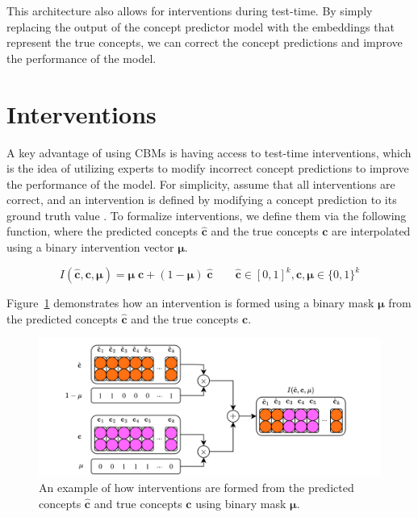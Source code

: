 This architecture also allows for interventions during test-time. By simply replacing
the output of the concept predictor model with the embeddings that represent
the true concepts, we can correct the concept predictions
 and improve the performance of the model. 


\section{Interventions}
A key advantage of using CBMs is having access to 
test-time interventions, which is the idea of utilizing experts
to modify incorrect concept predictions to improve the 
performance of the model.
For simplicity, assume that
all interventions are correct,  
and an intervention is defined by 
modifying a concept prediction to its ground truth value
. To formalize interventions, we define
them via the following function, where
the predicted concepts $\hat{\mathbf{c}}$ and the true concepts $\mathbf{c}$ are interpolated
using a binary intervention vector $\bm{\mu}$.

\begin{equation}\label{equation:intervention}
I(\hat{\mathbf{c}}, \mathbf{c}, \bm{\mu}) = 
\bm{\mu} \; \mathbf{c} + (1 - \bm{\mu}) \; \hat{\mathbf{c}} \qquad \hat{\mathbf{c}} \in [0,1]^k, \mathbf{c}, \bm{\mu} \in \{0, 1\}^k
\end{equation}

Figure~\ref{fig:interventions} demonstrates how an intervention
is formed using 
a binary mask $\bm{\mu}$ from the predicted concepts $\hat{\mathbf{c}}$ and the true concepts $\mathbf{c}$.

\begin{figure}[!ht]
    \centering
    \includegraphics[width=\textwidth]{figs/method/interventions.png}
    \caption{An example of how interventions are formed from the predicted concepts $\hat{\mathbf{c}}$
    and true concepts $\mathbf{c}$
     using binary mask $\bm{\mu}$.}
    \label{fig:interventions}
\end{figure}

